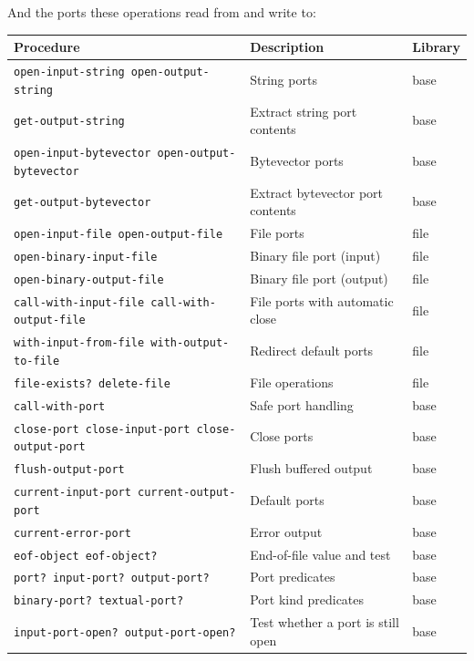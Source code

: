 And the ports these operations read from and write to:

\begin{center}
\small
\begin{tabularx}{\textwidth}{@{}p{4.8cm}Yl@{}}
\textbf{Procedure} & \textbf{Description} & \textbf{Library} \\
\hline
\texttt{open-input-string open-output-string} & String ports & base \\
\texttt{get-output-string} & Extract string port contents & base \\
\texttt{open-input-bytevector open-output-bytevector} & Bytevector ports & base \\
\texttt{get-output-bytevector} & Extract bytevector port contents & base \\
\texttt{open-input-file open-output-file} & File ports & file \\
\texttt{open-binary-input-file} & Binary file port (input) & file \\
\texttt{open-binary-output-file} & Binary file port (output) & file \\
\texttt{call-with-input-file call-with-output-file} & File ports with automatic close & file \\
\texttt{with-input-from-file with-output-to-file} & Redirect default ports & file \\
\texttt{file-exists? delete-file} & File operations & file \\
\texttt{call-with-port} & Safe port handling & base \\
\texttt{close-port close-input-port close-output-port} & Close ports & base \\
\texttt{flush-output-port} & Flush buffered output & base \\
\texttt{current-input-port current-output-port} & Default ports & base \\
\texttt{current-error-port} & Error output & base \\
\texttt{eof-object eof-object?} & End-of-file value and test & base \\
\texttt{port? input-port? output-port?} & Port predicates & base \\
\texttt{binary-port? textual-port?} & Port kind predicates & base \\
\texttt{input-port-open? output-port-open?} & Test whether a port is still open & base \\
\end{tabularx}
\end{center}

